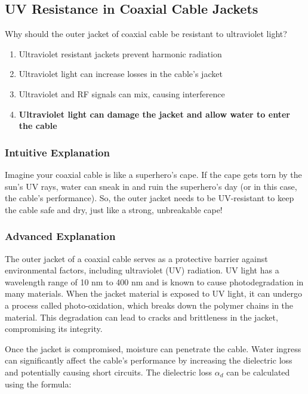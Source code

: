 \subsection{UV Resistance in Coaxial Cable Jackets}
\label{T7C10}

\begin{tcolorbox}[colback=gray!10!white,colframe=black!75!black,title=T7C10]
Why should the outer jacket of coaxial cable be resistant to ultraviolet light?
\begin{enumerate}[label=\Alph*)]
    \item Ultraviolet resistant jackets prevent harmonic radiation
    \item Ultraviolet light can increase losses in the cable’s jacket
    \item Ultraviolet and RF signals can mix, causing interference
    \item \textbf{Ultraviolet light can damage the jacket and allow water to enter the cable}
\end{enumerate}
\end{tcolorbox}

\subsubsection{Intuitive Explanation}
Imagine your coaxial cable is like a superhero’s cape. If the cape gets torn by the sun’s UV rays, water can sneak in and ruin the superhero’s day (or in this case, the cable’s performance). So, the outer jacket needs to be UV-resistant to keep the cable safe and dry, just like a strong, unbreakable cape!

\subsubsection{Advanced Explanation}
The outer jacket of a coaxial cable serves as a protective barrier against environmental factors, including ultraviolet (UV) radiation. UV light has a wavelength range of 10 nm to 400 nm and is known to cause photodegradation in many materials. When the jacket material is exposed to UV light, it can undergo a process called photo-oxidation, which breaks down the polymer chains in the material. This degradation can lead to cracks and brittleness in the jacket, compromising its integrity.

Once the jacket is compromised, moisture can penetrate the cable. Water ingress can significantly affect the cable’s performance by increasing the dielectric loss and potentially causing short circuits. The dielectric loss \( \alpha_d \) can be calculated using the formula:

